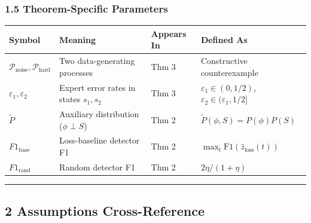 \documentclass[
  12pt,
]{ctexart}
\begin{document}
\subsubsection{1.5 Theorem-Specific
Parameters}\label{theorem-specific-parameters}

\begin{longtable}[]{@{}
  >{\raggedright\arraybackslash}p{}
  >{\raggedright\arraybackslash}p{}
  >{\raggedright\arraybackslash}p{}
  >{\raggedright\arraybackslash}p{}@{}}
\toprule\noalign{}
\begin{minipage}[b]{\linewidth}\raggedright
Symbol
\end{minipage} & \begin{minipage}[b]{\linewidth}\raggedright
Meaning
\end{minipage} & \begin{minipage}[b]{\linewidth}\raggedright
Appears In
\end{minipage} & \begin{minipage}[b]{\linewidth}\raggedright
Defined As
\end{minipage} \\
\midrule\noalign{}
\endhead
\bottomrule\noalign{}
\endlastfoot
\(\mathcal{P}_{\text{noise}}, \mathcal{P}_{\text{hard}}\) & Two
data-generating processes & Thm 3 & Constructive counterexample \\
\(\varepsilon_1, \varepsilon_2\) & Expert error rates in states
\(s_1, s_2\) & Thm 3 & \(\varepsilon_1 \in (0, 1/2)\),
\(\varepsilon_2 \in (\varepsilon_1, 1/2]\) \\
\(\tilde{P}\) & Auxiliary distribution (\(\phi \perp S\)) & Thm 2 &
\(\tilde{P}(\phi, S) = P(\phi)P(S)\) \\
\(F1_{\text{base}}\) & Loss-baseline detector F1 & Thm 2 &
\(\max_t \text{F1}(\hat{z}_{\text{loss}}(t))\) \\
\(F1_{\text{rand}}\) & Random detector F1 & Thm 2 &
\(2\eta/(1+\eta)\) \\
\end{longtable}

\begin{center}\rule{0.5\linewidth}{0.5pt}\end{center}

\subsection{2 Assumptions
Cross-Reference}\label{assumptions-cross-reference}
\end{document}
